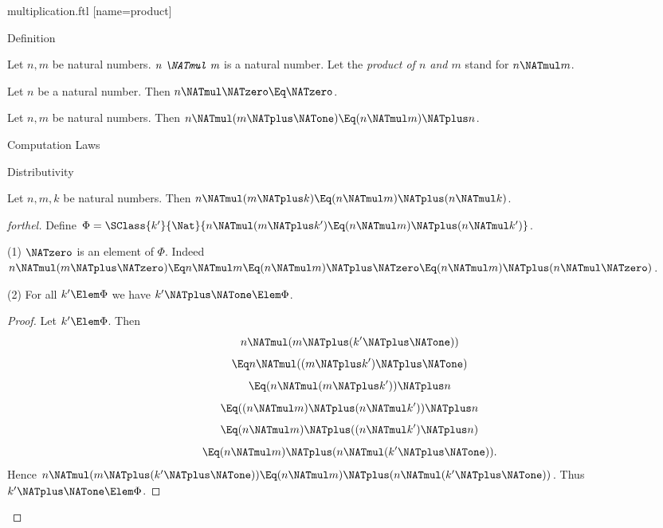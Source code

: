 \documentclass{stex}
\begin{document}
\begin{smodule}{multiplication.ftl}
[name=product]{\,\cdot\,}

\begin{sfragment}{Definition}
  \begin{signature}[forthel,for=NATmul]
    Let $n, m$ be natural numbers.
    $\emph{n \NATmul m}$ is a natural number.
    Let the \emph{product of $n$ and $m$} stand for $n \NATmul m$.
  \end{signature}

  \begin{axiom}[forthel,for=NATmul]
    Let $n$ be a natural number.
    Then $n \NATmul \NATzero \Eq \NATzero$.
  \end{axiom}

  \begin{axiom}[forthel,for=NATmul]
    Let $n, m$ be natural numbers.
    Then $n \NATmul (m \NATplus \NATone) \Eq (n \NATmul m) \NATplus n$.
  \end{axiom}
\end{sfragment}

\begin{sfragment}{Computation Laws}
  \begin{sfragment}{Distributivity}


    \begin{proposition}[forthel,name=left-distributivity of multiplication over addition]
      Let $n, m, k$ be natural numbers.
      Then $n \NATmul (m \NATplus k) \Eq (n \NATmul m) \NATplus (n \NATmul k)$.
    \end{proposition}
    \begin{proof}[forthel]
      Define $\Phi = \SClass{k'}{\Nat}{n \NATmul (m \NATplus k') \Eq (n \NATmul m) \NATplus (n \NATmul k')}$.

      (1) $\NATzero$ is an element of $\Phi$.
      Indeed $n \NATmul (m \NATplus \NATzero)
        \Eq n \NATmul m
        \Eq (n \NATmul m) \NATplus \NATzero
        \Eq (n \NATmul m) \NATplus (n \NATmul \NATzero)$.

      (2) For all $k' \Elem \Phi$ we have $k' \NATplus \NATone \Elem \Phi$. 
      \begin{proof}
        Let $k'\Elem \Phi$.
        Then
        \[  n \NATmul (m \NATplus (k' \NATplus \NATone))                  \]
        \[    \Eq n \NATmul ((m \NATplus k') \NATplus \NATone)              \]
        \[    \Eq (n \NATmul (m \NATplus k')) \NATplus n              \]
        \[    \Eq ((n \NATmul m) \NATplus (n \NATmul k')) \NATplus n    \]
        \[    \Eq (n \NATmul m) \NATplus ((n \NATmul k') \NATplus n)    \]
        \[    \Eq (n \NATmul m) \NATplus (n \NATmul (k' \NATplus \NATone)).   \]
        Hence $n \NATmul (m \NATplus (k' \NATplus \NATone)) \Eq (n \NATmul m) \NATplus (n \NATmul (k' \NATplus \NATone))$.
        Thus $k' \NATplus \NATone \Elem \Phi$.
      \end{proof}


\end{proof}
\end{sfragment}
\end{sfragment}
\end{smodule}
\end{document}
